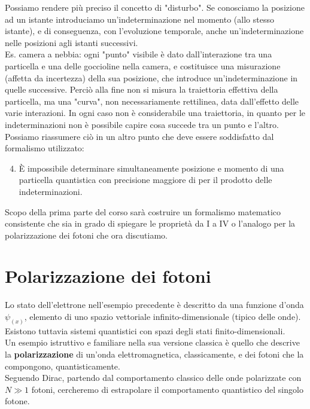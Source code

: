 \documentclass[FisicaTeorica.tex]{subfiles}
\begin{document}
Possiamo rendere più preciso il concetto di "disturbo". 
Se conosciamo la posizione ad un istante introduciamo un'indeterminazione nel momento (allo stesso istante), e di conseguenza, con l'evoluzione temporale, anche un'indeterminazione nelle posizioni agli istanti successivi.\\
Es. camera a nebbia: ogni "punto" visibile è dato dall'interazione tra una particella e una delle goccioline nella camera, e costituisce una misurazione (affetta da incertezza) della sua posizione, che introduce un'indeterminazione in quelle successive. Perciò alla fine non si misura la traiettoria effettiva della particella, ma una "curva", non necessariamente rettilinea, data dall'effetto delle varie interazioni.
In ogni caso non è considerabile una traiettoria, in quanto per le indeterminazioni non è possibile capire cosa succede tra un punto e l'altro.\\
Possiamo riassumere ciò in un altro punto che deve essere soddisfatto dal formalismo utilizzato:
\begin{enumerate}[I]
\setcounter{enumi}{3}
    \item È impossibile   determinare simultaneamente posizione e momento di una particella quantistica con precisione maggiore di  per il prodotto delle indeterminazioni. 
\end{enumerate}

Scopo della prima parte del corso sarà costruire un formalismo matematico consistente che sia in grado di spiegare le proprietà da I a IV o l'analogo per la polarizzazione dei fotoni che ora discutiamo.\\

\section{Polarizzazione dei fotoni} 
Lo stato dell'elettrone nell'esempio precedente è descritto da una funzione d'onda $\psi_(x)$, elemento di uno spazio vettoriale infinito-dimensionale (tipico delle onde).\\
Esistono tuttavia sistemi quantistici con spazi degli stati finito-dimensionali.\\
Un esempio istruttivo e familiare nella sua versione classica è quello che descrive la \textbf{polarizzazione} di un'onda elettromagnetica, classicamente, e dei fotoni che la compongono, quantisticamente.\\
Seguendo Dirac, partendo dal comportamento classico delle onde polarizzate con $N\gg 1$ fotoni, cercheremo di estrapolare il comportamento quantistico del singolo fotone.\\
\end{document}
